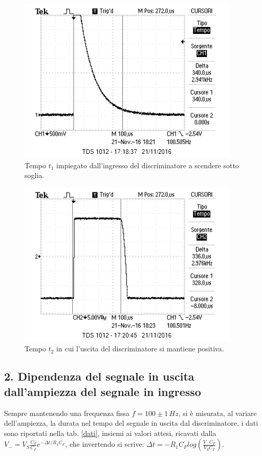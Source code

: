 \documentclass[10pt,a4paper]{article}
\begin{document}
\begin{figure}[htb!]
\centering
\includegraphics[scale=1.0]{immagini/periodoEsponenziale.png}
\caption{Tempo $t_1$ impiegato dall'ingresso del discriminatore a scendere sotto soglia.}
\label{tempoEspo}
\end{figure}

\begin{figure}[htb!]
\centering
\includegraphics[scale=1.0]{immagini/tempoQuadra.png}
\caption{Tempo $t_2$ in cui l'uscita del discriminatore si mantiene positiva.}
\label{tempoUscita}
\end{figure}


\subsection*{2. Dipendenza del segnale in uscita dall'ampiezza del segnale in ingresso}

Sempre mantenendo una frequenza fissa $f = 100 \pm 1 \, Hz$, si è misurata, al variare dell'ampiezza, la durata nel tempo del segnale in uscita dal discriminatore, i dati sono riportati nella tab. \ref{dati}, insiemi ai valori attesi, ricavati dalla $V_-=V_S \frac{C_T}{C_F} e^{- \Delta t/R_1 C_F}$, che invertendo si scrive: $\Delta t = -R_1 C_F log\left( \frac{V_- C_F}{V_S C_T}\right)$.
\end{document}
